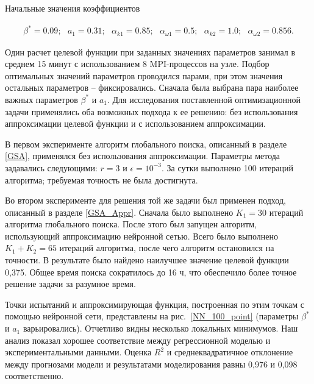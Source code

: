 \documentclass[mathematics,article,accept,pdftex,moreauthors]{Definitions/mdpi}
\begin{document}
Начальные значения коэффициентов
\begin{linenomath}
\begin{equation}
	\begin{aligned}
		\beta^* = 0.09;\ \ \ a_1 = 0.31;\ \ \ \alpha_{k 1} = 0.85;\ \ \ \alpha_{\omega 1} = 0.5; \ \ \ \alpha_{k 2} = 1.0;\ \ \ \alpha_{\omega 2} = 0.856.
	\end{aligned}
\end{equation}
\end{linenomath}

Один расчет целевой функции при заданных значениях параметров занимал в среднем 15 минут с использованием 8 MPI-процессов на узле. 
Подбор оптимальных значений параметров проводился парами, при этом значения остальных параметров -- фиксировались. 
Сначала была выбрана пара наиболее важных параметров $\beta^*$ и $a_1$.
Для исследования поставленной оптимизационной задачи применялись оба возможных подхода к ее решению: без использования аппроксимации целевой функции и с использованием аппроксимации.

В первом эксперименте алгоритм глобального поиска, описанный в разделе \ref{GSA}, применялся без использования аппроксимации.
Параметры метода задавались следующими: $r = 3$ и $\epsilon = 10^{-3}$.
За сутки выполнено 100 итераций алгоритма; требуемая точность не была достигнута.

Во втором эксперименте для решения той же задачи был применен подход, описанный в разделе \ref{GSA_Appr}.
Сначала было выполнено $K_1 = 30$ итераций алгоритма глобального поиска.
После этого был запущен алгоритм, использующий аппроксимацию нейронной сетью.
Всего было выполнено $K_1 + K_2 = 65$ итераций алгоритма, после чего алгоритм остановился на точности.
В результате было найдено наилучшее значение целевой функции 0,375.
Общее время поиска сократилось до 16 ч, что обеспечило более точное решение задачи за разумное время.

Точки испытаний и аппроксимирующая функция, построенная по этим точкам с помощью нейронной сети, представлены на рис.~\ref{NN_100_point} (параметры $\beta^*$ и $a_1$ варьировались). Отчетливо видны несколько локальных минимумов.
Наш анализ показал хорошее соответствие между регрессионной моделью и экспериментальными данными.
Оценка $R^2$ и среднеквадратичное отклонение между прогнозами модели и результатами моделирования равны 0,976 и 0,098 соответственно.
\end{document}
